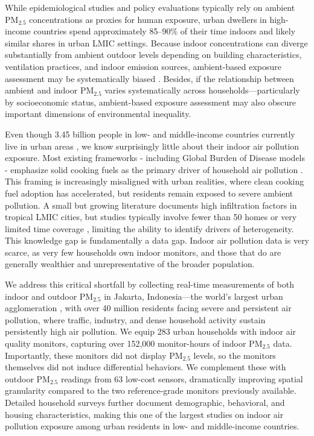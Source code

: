 \documentclass[9pt,twocolumn,twoside]{pnas-new}
\begin{document}
While epidemiological studies and policy evaluations typically rely on ambient PM$_{2.5}$ concentrations as proxies for human exposure, urban dwellers in high-income countries spend approximately 85–90\% of their time indoors \citep{klepeis_national_2001} and likely similar shares in urban LMIC settings.
Because indoor concentrations can diverge substantially from ambient outdoor levels depending on building characteristics, ventilation practices, and indoor emission sources, ambient-based exposure assessment may be systematically biased \citep{avery_estimating_2010, evangelopoulos_pm25_2020}. Besides, if the relationship between ambient and indoor PM$_{2.5}$ varies systematically across households—particularly by socioeconomic status, ambient-based exposure assessment may also obscure important dimensions of environmental inequality. 

Even though 3.45 billion people in low- and middle-income countries currently live in urban areas \citep{noauthor_urban_2023}, we know surprisingly little about their indoor air pollution exposure. Most existing frameworks - including Global Burden of Disease models - emphasize solid cooking fuels as the primary driver of household air pollution \citep{bennitt_global_2025}. This framing is increasingly misaligned with urban realities, where clean cooking fuel adoption has accelerated, but residents remain exposed to severe ambient pollution. A small but growing literature documents high infiltration factors in tropical LMIC cities, but studies typically involve fewer than 50 homes or very limited time coverage \citep{Sahaetal2025, GURLEY201311, Anandetal2022, Hossainetal2021, KAJJOBA20244184, zhou2011household, kephart2020indoor, fandino2020household}, limiting the ability to identify drivers of heterogeneity. This knowledge gap is fundamentally a data gap. Indoor air pollution data is very scarce, as very few households own indoor monitors, and those that do are generally wealthier and unrepresentative of the broader population. 

We address this critical shortfall by collecting real-time measurements of both indoor and outdoor PM$_{2.5}$ in Jakarta, Indonesia—the world's largest urban agglomeration \citep{undesa2025wup}, with over 40 million residents facing severe and persistent air pollution, where traffic, industry, and dense household activity sustain persistently high air pollution. We equip 283 urban households with indoor air quality monitors, capturing over 152,000 monitor-hours of indoor PM$_{2.5}$ data. Importantly, these monitors did not display PM$_{2.5}$ levels, so the monitors themselves did not induce differential behaviors. We complement these with outdoor PM$_{2.5}$ readings from 63 low-cost sensors, dramatically improving spatial granularity compared to the two reference-grade monitors previously available. Detailed household surveys further document demographic, behavioral, and housing characteristics, making this one of the largest studies on indoor air pollution exposure among urban residents in low- and middle-income countries. 
\end{document}
